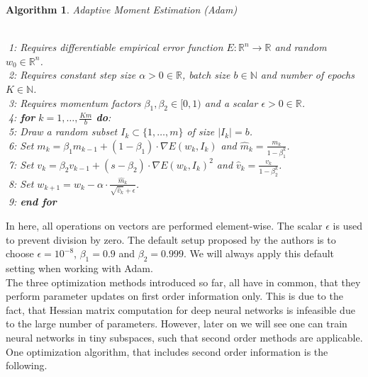 \documentclass[11pt, a4paper]{article}
\newtheorem{algorithm}[theorem]{Algorithm}
\newcommand{\N}{\mathds{N}}
\newcommand{\R}{\mathds{R}}
\begin{document}
\begin{algorithm}
\caption{Adaptive Moment Estimation (Adam)} \ \\
\textcolor{white}{$\Big |$}1: Requires differentiable empirical error function $E: \R^n \to \R$ and random $w_0 \in \R^n$.  \\
\textcolor{white}{$\Big |$}2: Requires constant step size $\alpha > 0 \in \R$, batch size $b \in \N$ and number of epochs $K \in \N$. \\
\textcolor{white}{$\Big |$}3: Requires momentum factors $\beta_1, \beta_2 \in [0,1)$ and a scalar $\epsilon > 0 \in \R$. \\
\textcolor{white}{$\Big |$}4: \textbf{for} $k=1, \dots, \frac{Km}{b}$ \textbf{do}: \\
\textcolor{white}{$\Big |$}5: \quad Draw a random subset $I_k \subset \{1, \dots, m \}$ of size $| I_k | = b$. \\
\textcolor{white}{$\Big |$}6: \quad Set $m_{k} = \beta_1 m_{k-1} + (1-\beta_1) \cdot \nabla E(w_k,I_k)$ and $\hat{m}_k = \frac{m_k}{1-\beta_1^k}$. \\
\textcolor{white}{$\Big |$}7: \quad Set $v_{k} = \beta_2 v_{k-1} + (s-\beta_2) \cdot \nabla E(w_k,I_k)^2$ and $\hat{v}_k = \frac{v_k}{1-\beta_2^k}$. \\
\textcolor{white}{$\Big |$}8: \quad Set $w_{k+1} = w_k - \alpha \cdot \frac{\hat{m}_k}{\sqrt{\hat{v}_k} + \epsilon}$. \\
\textcolor{white}{$\Big |$}9: \textbf{end for} \\
\end{algorithm}
\pagebreak

In here, all operations on vectors are performed element-wise. The scalar $\epsilon$ is used to prevent division by zero. The default setup proposed by the authors is to choose $\epsilon = 10^{-8}$, $\beta_1 = 0.9$ and $\beta_2 = 0.999$. We will always apply this default setting when working with Adam. \\

The three optimization methods introduced so far, all have in common, that they perform parameter updates on first order information only. This is due to the fact, that Hessian matrix computation for deep neural networks is infeasible due to the large number of parameters. However, later on we will see one can train neural networks in tiny subspaces, such that second order methods are applicable. One optimization algorithm, that includes second order information is the following.
\end{document}
